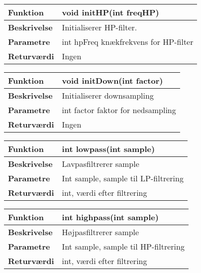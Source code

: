 \begin{center}
    \begin{tabular}{ | l | p{10cm} |}
    \hline
    \textbf{Funktion}	 	& void initHP(int freqHP)									\\ \hline
    \textbf{Beskrivelse} 	& Initialiserer HP-filter.						\\ \hline
    \textbf{Parametre}		& int hpFreq knækfrekvens for HP-filter												 																									\\ \hline
    \textbf{Returværdi} 	& Ingen														     \\ \hline
    \end{tabular}
\end{center}

\begin{center}
    \begin{tabular}{ | l | p{10cm} |}
    \hline
    \textbf{Funktion}	 	& void initDown(int factor)							\\ \hline
    \textbf{Beskrivelse} 	& Initialiserer downsampling 						\\ \hline
    \textbf{Parametre}		& int factor faktor for nedsampling					\\ \hline
    \textbf{Returværdi} 	& Ingen												\\ \hline
    \end{tabular}
\end{center}

\begin{center}
    \begin{tabular}{ | l | p{10cm} |}
    \hline
    \textbf{Funktion}	 	& int lowpass(int sample)								\\ \hline
    \textbf{Beskrivelse} 	& Lavpasfiltrerer sample								\\ \hline
    \textbf{Parametre}		& Int sample, sample til LP-filtrering					\\ \hline
    \textbf{Returværdi} 	& int, værdi efter filtrering							\\ \hline
    \end{tabular}
\end{center}

\begin{center}
    \begin{tabular}{ | l | p{10cm} |}
    \hline
    \textbf{Funktion}	 	& int highpass(int sample)								\\ \hline
    \textbf{Beskrivelse} 	& Højpasfiltrerer sample								\\ \hline
    \textbf{Parametre}		& Int sample, sample til HP-filtrering					\\ \hline
    \textbf{Returværdi} 	& int, værdi efter filtrering							\\ \hline
    \end{tabular}
\end{center}

